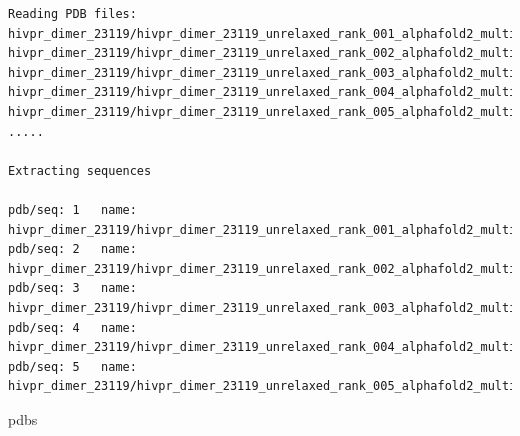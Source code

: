 \documentclass[
  letterpaper,
  DIV=11,
  numbers=noendperiod]{scrartcl}
\newenvironment{Shaded}{\begin{snugshade}}{\end{snugshade}}
\newcommand{\NormalTok}[1]{\textcolor[rgb]{0.00,0.23,0.31}{#1}}
\begin{document}
\begin{verbatim}
Reading PDB files:
hivpr_dimer_23119/hivpr_dimer_23119_unrelaxed_rank_001_alphafold2_multimer_v3_model_1_seed_000.pdb
hivpr_dimer_23119/hivpr_dimer_23119_unrelaxed_rank_002_alphafold2_multimer_v3_model_5_seed_000.pdb
hivpr_dimer_23119/hivpr_dimer_23119_unrelaxed_rank_003_alphafold2_multimer_v3_model_4_seed_000.pdb
hivpr_dimer_23119/hivpr_dimer_23119_unrelaxed_rank_004_alphafold2_multimer_v3_model_2_seed_000.pdb
hivpr_dimer_23119/hivpr_dimer_23119_unrelaxed_rank_005_alphafold2_multimer_v3_model_3_seed_000.pdb
.....

Extracting sequences

pdb/seq: 1   name: hivpr_dimer_23119/hivpr_dimer_23119_unrelaxed_rank_001_alphafold2_multimer_v3_model_1_seed_000.pdb 
pdb/seq: 2   name: hivpr_dimer_23119/hivpr_dimer_23119_unrelaxed_rank_002_alphafold2_multimer_v3_model_5_seed_000.pdb 
pdb/seq: 3   name: hivpr_dimer_23119/hivpr_dimer_23119_unrelaxed_rank_003_alphafold2_multimer_v3_model_4_seed_000.pdb 
pdb/seq: 4   name: hivpr_dimer_23119/hivpr_dimer_23119_unrelaxed_rank_004_alphafold2_multimer_v3_model_2_seed_000.pdb 
pdb/seq: 5   name: hivpr_dimer_23119/hivpr_dimer_23119_unrelaxed_rank_005_alphafold2_multimer_v3_model_3_seed_000.pdb 
\end{verbatim}

\begin{Shaded}
\begin{Highlighting}[]
\NormalTok{pdbs}
\end{Highlighting}
\end{Shaded}
\end{document}
